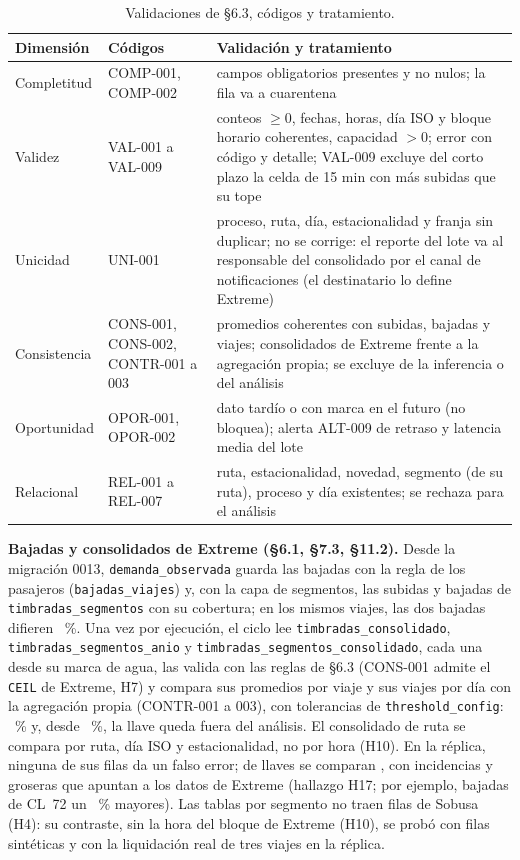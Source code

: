 \documentclass[10pt,a4paper]{article}
\begin{document}
\begin{table}[ht]
\centering\small
\caption{Validaciones de §6.3, códigos y tratamiento.}
\begin{tabularx}{\linewidth}{@{}llX@{}}
\toprule
Dimensión & Códigos & Validación y tratamiento \\
\midrule
Completitud & COMP-001, COMP-002 & campos obligatorios presentes y no nulos; la fila va a cuarentena \\
Validez & VAL-001 a VAL-009 & conteos $\ge 0$, fechas, horas, día ISO y bloque horario coherentes, capacidad $> 0$; error con código y detalle; VAL-009 excluye del corto plazo la celda de 15 min con más subidas que su tope \\
Unicidad & UNI-001 & proceso, ruta, día, estacionalidad y franja sin duplicar; no se corrige: el reporte del lote va al responsable del consolidado por el canal de notificaciones (el destinatario lo define Extreme) \\
Consistencia & CONS-001, CONS-002, CONTR-001 a 003 & promedios coherentes con subidas, bajadas y viajes; consolidados de Extreme frente a la agregación propia; se excluye de la inferencia o del análisis \\
Oportunidad & OPOR-001, OPOR-002 & dato tardío o con marca en el futuro (no bloquea); alerta ALT-009 de retraso y latencia media del lote \\
Relacional & REL-001 a REL-007 & ruta, estacionalidad, novedad, segmento (de su ruta), proceso y día existentes; se rechaza para el análisis \\
\bottomrule
\end{tabularx}
\end{table}

\textbf{Bajadas y consolidados de Extreme (§6.1, §7.3, §11.2).} Desde la migración 0013,
\texttt{demanda\_observada} guarda las bajadas con la regla de los pasajeros (\texttt{bajadas\_viajes}) y, con la capa
de segmentos, las subidas y bajadas de \texttt{timbradas\_segmentos} con su cobertura; en los mismos viajes, las dos
bajadas difieren \BajadasDifMismos~\%.  Una vez por ejecución, el ciclo
lee \texttt{timbradas\_consolidado}, \texttt{timbradas\_segmentos\_anio} y \texttt{timbradas\_segmentos\_consolidado},
cada una desde su marca de agua, las valida con las reglas de §6.3 (CONS-001 admite el \texttt{CEIL} de Extreme, H7) y
compara sus promedios por viaje y sus viajes por día con la agregación propia (CONTR-001 a 003), con tolerancias de
\texttt{threshold\_config}: \ConsTolerancia~\% y, desde \ConsTolGrosera~\%, la llave queda fuera del análisis. El
consolidado de ruta se compara por ruta, día ISO y estacionalidad, no por hora (H10). En la réplica, ninguna de sus
\ConsFilas{} filas da un falso error; de \ConsLlaves{} llaves se comparan \ConsComparadas, con \ConsIncidencias{}
incidencias y \ConsGroseras{} groseras que apuntan a los datos de Extreme (hallazgo H17; por ejemplo, bajadas de
CL~72 un \ConsBajadasClDif~\% mayores). Las tablas por segmento no traen filas de Sobusa (H4): su contraste, sin la hora del
bloque de Extreme (H10), se probó con filas sintéticas y con la liquidación real de tres viajes en la réplica. 
\end{document}
